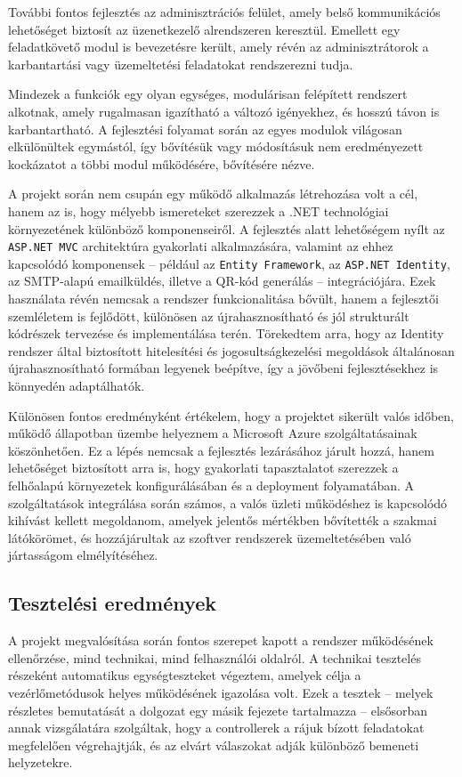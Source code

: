 További fontos fejlesztés az adminisztrációs felület, amely belső kommunikációs lehetőséget biztosít az üzenetkezelő alrendszeren keresztül. Emellett egy feladatkövető modul is bevezetésre került, amely révén az adminisztrátorok a karbantartási vagy üzemeltetési feladatokat rendszerezni tudja.

Mindezek a funkciók egy olyan egységes, modulárisan felépített rendszert alkotnak, amely rugalmasan igazítható a változó igényekhez, és hosszú távon is karbantartható. A fejlesztési folyamat során az egyes modulok világosan elkülönültek egymástól, így bővítésük vagy módosításuk nem eredményezett kockázatot a többi modul működésére, bővítésére nézve.

A projekt során nem csupán egy működő alkalmazás létrehozása volt a cél, hanem az is, hogy mélyebb ismereteket szerezzek a .NET technológiai környezetének különböző komponenseiről. A fejlesztés alatt lehetőségem nyílt az \texttt{ASP.NET MVC} architektúra gyakorlati alkalmazására, valamint az ehhez kapcsolódó komponensek – például az \texttt{Entity Framework}, az \texttt{ASP.NET Identity}, az SMTP-alapú emailküldés, illetve a QR-kód generálás – integrációjára. Ezek használata révén nemcsak a rendszer funkcionalitása bővült, hanem a fejlesztői szemléletem is fejlődött, különösen az újrahasznosítható és jól strukturált kódrészek tervezése és implementálása terén. Törekedtem arra, hogy az Identity rendszer által biztosított hitelesítési és jogosultságkezelési megoldások általánosan újrahasznosítható formában legyenek beépítve, így a jövőbeni fejlesztésekhez is könnyedén adaptálhatók.

Különösen fontos eredményként értékelem, hogy a projektet sikerült valós időben, működő állapotban üzembe helyeznem a Microsoft Azure szolgáltatásainak köszönhetően. Ez a lépés nemcsak a fejlesztés lezárásához járult hozzá, hanem lehetőséget biztosított arra is, hogy gyakorlati tapasztalatot szerezzek a felhőalapú környezetek konfigurálásában és a deployment folyamatában. A szolgáltatások integrálása során számos, a valós üzleti működéshez is kapcsolódó kihívást kellett megoldanom, amelyek jelentős mértékben bővítették a szakmai látókörömet, és hozzájárultak az szoftver rendszerek üzemeltetésében való jártasságom elmélyítéséhez.


\subsection{Tesztelési eredmények}

A projekt megvalósítása során fontos szerepet kapott a rendszer működésének ellenőrzése, mind technikai, mind felhasználói oldalról. A technikai tesztelés részeként automatikus egységteszteket végeztem, amelyek célja a vezérlőmetódusok helyes működésének igazolása volt. Ezek a tesztek – melyek részletes bemutatását a dolgozat egy másik fejezete tartalmazza – elsősorban annak vizsgálatára szolgáltak, hogy a controllerek a rájuk bízott feladatokat megfelelően végrehajtják, és az elvárt válaszokat adják különböző bemeneti helyzetekre.

